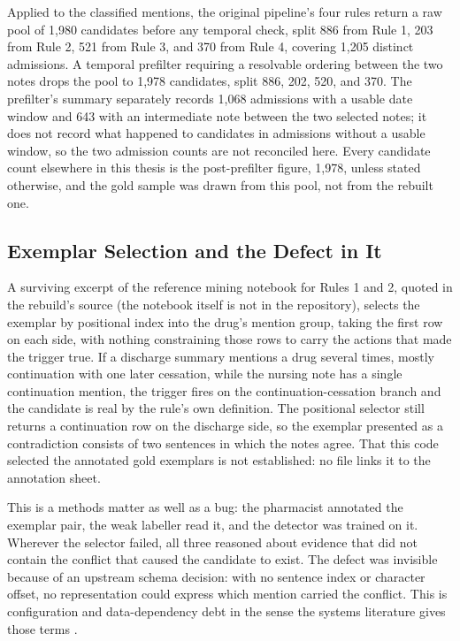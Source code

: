 Applied to the classified mentions, the original pipeline's four rules return a raw pool of 1,980
candidates before any temporal check, split 886 from Rule 1, 203 from Rule 2, 521 from Rule 3, and 370
from Rule 4, covering 1,205 distinct admissions. A temporal prefilter requiring a resolvable ordering
between the two notes drops the pool to 1,978 candidates, split 886, 202, 520, and 370. The
prefilter's summary separately records 1,068 admissions with a usable date window and 643 with an
intermediate note between the two selected notes; it does not record what happened to candidates in
admissions without a usable window, so the two admission counts are not reconciled here. Every
candidate count elsewhere in this thesis is the post-prefilter figure, 1,978, unless stated
otherwise, and the gold sample was drawn from this pool, not from the rebuilt one.

\subsection{Exemplar Selection and the Defect in It}
\label{sec:m-exemplar}

A surviving excerpt of the reference mining notebook for Rules 1 and 2, quoted in the rebuild's
source (the notebook itself is not in the repository), selects the exemplar by positional index into the
drug's mention group, taking the first row on each side, with nothing constraining those rows to
carry the actions that made the trigger true. If a discharge summary mentions a drug several times,
mostly continuation with one later cessation, while the nursing note has a single continuation
mention, the trigger fires on the continuation-cessation branch and the candidate is real by the
rule's own definition. The positional selector still returns a continuation row on the discharge
side, so the exemplar presented as a contradiction consists of two sentences in which the notes
agree.
That this code selected the annotated gold exemplars is not established: no file links it to
the annotation sheet.

This is a methods matter as well as a bug: the pharmacist annotated the exemplar pair,
the weak labeller read it, and the detector was trained on it. Wherever the selector failed, all
three reasoned about evidence that did not contain the conflict that caused the candidate to exist.
The defect was invisible because of an upstream schema decision: with no sentence index or
character offset, no representation could express which mention carried the conflict. This
is configuration and data-dependency debt in the sense the systems literature gives those
terms \citep{sculley2015debt}.

